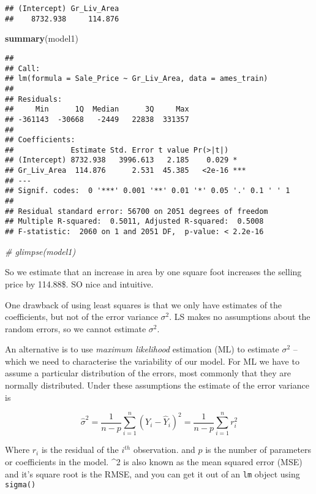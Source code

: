 \documentclass[]{article}
\newenvironment{Shaded}{\begin{snugshade}}{\end{snugshade}}
\newcommand{\CommentTok}[1]{\textcolor[rgb]{0.56,0.35,0.01}{\textit{#1}}}
\newcommand{\KeywordTok}[1]{\textcolor[rgb]{0.13,0.29,0.53}{\textbf{#1}}}
\newcommand{\NormalTok}[1]{#1}
\begin{document}
\begin{verbatim}
## (Intercept) Gr_Liv_Area 
##    8732.938     114.876
\end{verbatim}

\begin{Shaded}
\begin{Highlighting}[]
\KeywordTok{summary}\NormalTok{(model1)}
\end{Highlighting}
\end{Shaded}

\begin{verbatim}
## 
## Call:
## lm(formula = Sale_Price ~ Gr_Liv_Area, data = ames_train)
## 
## Residuals:
##     Min      1Q  Median      3Q     Max 
## -361143  -30668   -2449   22838  331357 
## 
## Coefficients:
##             Estimate Std. Error t value Pr(>|t|)    
## (Intercept) 8732.938   3996.613   2.185    0.029 *  
## Gr_Liv_Area  114.876      2.531  45.385   <2e-16 ***
## ---
## Signif. codes:  0 '***' 0.001 '**' 0.01 '*' 0.05 '.' 0.1 ' ' 1
## 
## Residual standard error: 56700 on 2051 degrees of freedom
## Multiple R-squared:  0.5011, Adjusted R-squared:  0.5008 
## F-statistic:  2060 on 1 and 2051 DF,  p-value: < 2.2e-16
\end{verbatim}

\begin{Shaded}
\begin{Highlighting}[]
\CommentTok{\# glimpse(model1)}
\end{Highlighting}
\end{Shaded}

So we estimate that an increase in area by one square foot increases the
selling price by 114.88\$. SO nice and intuitive.

One drawback of using least squares is that we only have estimates of
the coefficients, but not of the error variance \(\sigma^2\). LS makes
no assumptions about the random errors, so we cannot estimate
\(\sigma^2\).

An alternative is to use \emph{maximum likelihood} estimation (ML) to
estimate \(\sigma^2\) -- which we need to characterise the variability
of our model. For ML we have to assume a particular distribution of the
errors, most commonly that they are normally distributed. Under these
assumptions the estimate of the error variance is

\[\hat\sigma^2=\frac{1}{n-p} \sum^n_{i=1}(Y_i-\hat Y_i)^2 = \frac{1}{n-p} \sum^n_{i=1}r_i^2\]

Where \(r_i\) is the residual of the \(i^{th}\) observation. and \(p\)
is the number of parameters or coefficients in the model.
\hat\sigma\^{}2 is also known as the mean squared error (MSE) and it's
square root is the RMSE, and you can get it out of an \texttt{lm} object
using \texttt{sigma()}
\end{document}
